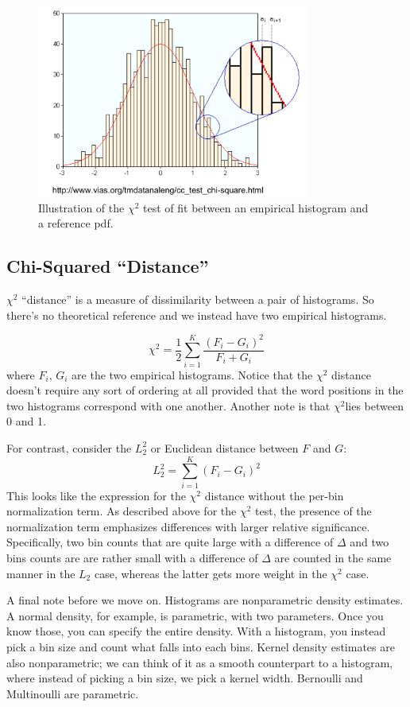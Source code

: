 \documentclass[a4paper]{article}
\begin{document}
\begin{figure}
\centering
\includegraphics[width=0.8\textwidth]{fig6_chisq.png}
\caption{\label{fig:chisq}Illustration of the $\chi^2$ test of fit between an empirical histogram and a reference pdf.}
\end{figure}

\subsection{Chi-Squared ``Distance''}

$\chi^2$ ``distance'' is a measure of dissimilarity between a pair of histograms.  So there's no theoretical reference and we instead have two empirical histograms.

$$
\chi^2 = \frac{1}{2}\sum_{i=1}^{K} \frac{(F_i - G_i)^2}{F_i+G_i}
$$ where $F_i$, $G_i$ are the two empirical histograms.
Notice that the $\chi^2$ distance doesn't require any sort of ordering at all provided that the word positions in the two histograms correspond with one another. Another note is that $\chi^2$lies between 0 and 1. 

For contrast, consider the $L_2^2$ or Euclidean distance between $F$ and $G$:
$$
L_2^2 = \sum_{i=1}^{K} (F_i - G_i)^2
$$
This looks like the expression for the $\chi^2$ distance without the per-bin normalization term.  As described above for the $\chi^2$ test, the presence of the normalization term emphasizes differences with larger relative significance.  Specifically, two bin counts that are quite large with a difference of $\Delta$ and two bins counts are are rather small with a difference of $\Delta$ are counted in the same manner in the $L_2$ case, whereas the latter gets more weight in the $\chi^2$ case. 

A final note before we move on.  Histograms are nonparametric density estimates.  A normal density, for example, is parametric, with two parameters.  Once you know those, you can specify the entire density.  With a histogram, you instead pick a bin size and count what falls into each bins.  Kernel density estimates are also nonparametric; we can think of it as a smooth counterpart to a histogram, where instead of picking a bin size, we pick a kernel width.  Bernoulli and Multinoulli are parametric.
\end{document}
